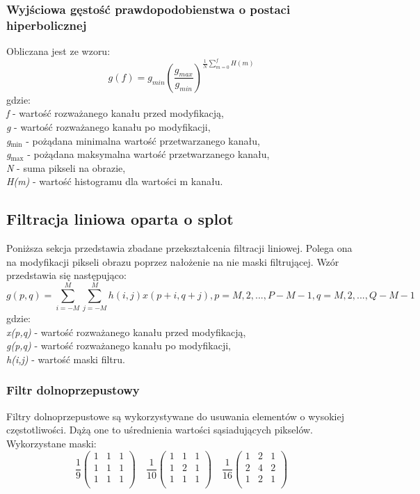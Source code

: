 \documentclass{classrep}
\begin{document}
\subsubsection{Wyjściowa gęstość prawdopodobienstwa o postaci hiperbolicznej}
Obliczana jest ze wzoru:
\[ g(f) = g_{min}(\frac{g_{max}}{g_{min}})^{\frac{1}{N} \displaystyle\sum_{m=0}^{f} H(m)} \]
gdzie:\\
\textit{f} - wartość rozważanego kanału przed modyfikacją,\\
\textit{g} - wartość rozważanego kanału po modyfikacji,\\
\textit{g$_{\text{min}}$} - pożądana minimalna wartość przetwarzanego kanału,\\
\textit{g$_{\text{max}}$} - pożądana maksymalna wartość przetwarzanego kanału,\\
\textit{N} - suma pikseli na obrazie,\\
\textit{H(m)} - wartość histogramu dla wartości m kanału.\\

\subsection{Filtracja liniowa oparta o splot}
Poniższa sekcja przedstawia zbadane przekształcenia filtracji liniowej. Polega ona na modyfikacji pikseli obrazu poprzez nałożenie na nie maski filtrującej. Wzór przedstawia się następująco: 
\[ g(p,q) = \displaystyle\sum_{i=-M}^{M}\displaystyle\sum_{j=-M}^{M} h(i,j)x(p+i,q+j), p = M,2,...,P-M-1, q = M,2,...,Q-M-1 \]
gdzie:\\
\textit{x(p,q)} - wartość rozważanego kanału przed modyfikacją,\\
\textit{g(p,q)} - wartość rozważanego kanału po modyfikacji,\\
\textit{h(i,j)} - wartość maski filtru.\\

\subsubsection{Filtr dolnoprzepustowy}
Filtry dolnoprzepustowe są wykorzystywane do usuwania elementów o wysokiej częstotliwości. Dążą one to uśrednienia wartości sąsiadujących pikselów.
Wykorzystane maski:
\[
\frac{1}{9}
 \begin{pmatrix}
  1 & 1 & 1 \\
  1 & 1 & 1 \\
  1 & 1 & 1 \\
 \end{pmatrix}
\quad
\frac{1}{10}
 \begin{pmatrix}
  1 & 1 & 1 \\
  1 & 2 & 1 \\
  1 & 1 & 1 \\
 \end{pmatrix}
\quad
\frac{1}{16}
 \begin{pmatrix}
  1 & 2 & 1 \\
  2 & 4 & 2 \\
  1 & 2 & 1 \\
 \end{pmatrix}
\]
\end{document}
